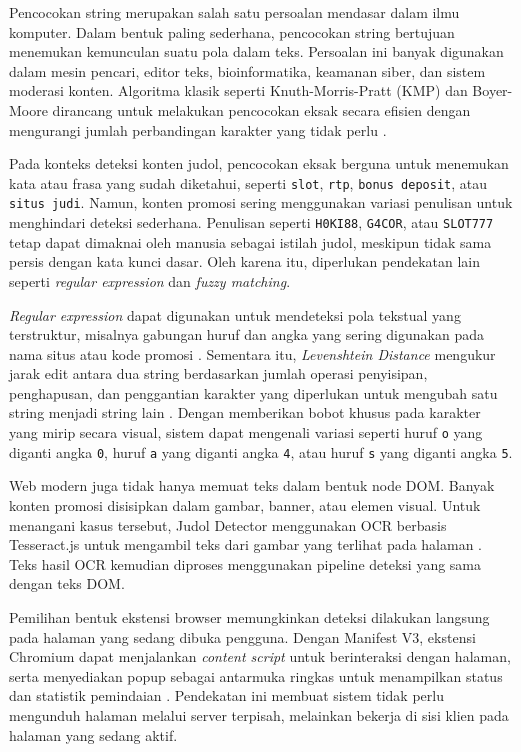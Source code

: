 Pencocokan string merupakan salah satu persoalan mendasar dalam ilmu komputer.
Dalam bentuk paling sederhana, pencocokan string bertujuan menemukan kemunculan
suatu pola dalam teks. Persoalan ini banyak digunakan dalam mesin pencari,
editor teks, bioinformatika, keamanan siber, dan sistem moderasi konten.
Algoritma klasik seperti Knuth-Morris-Pratt (KMP) dan Boyer-Moore dirancang
untuk melakukan pencocokan eksak secara efisien dengan mengurangi jumlah
perbandingan karakter yang tidak perlu \cite{cormen2009introduction}.

Pada konteks deteksi konten judol, pencocokan eksak berguna untuk menemukan
kata atau frasa yang sudah diketahui, seperti \texttt{slot}, \texttt{rtp},
\texttt{bonus deposit}, atau \texttt{situs judi}. Namun, konten promosi sering
menggunakan variasi penulisan untuk menghindari deteksi sederhana. Penulisan
seperti \texttt{H0KI88}, \texttt{G4COR}, atau \texttt{SLOT777} tetap dapat
dimaknai oleh manusia sebagai istilah judol, meskipun tidak sama persis dengan
kata kunci dasar. Oleh karena itu, diperlukan pendekatan lain seperti
\textit{regular expression} dan \textit{fuzzy matching}.

\textit{Regular expression} dapat digunakan untuk mendeteksi pola tekstual
yang terstruktur, misalnya gabungan huruf dan angka yang sering digunakan pada
nama situs atau kode promosi \cite{friedl2006regex}. Sementara itu,
\textit{Levenshtein Distance} mengukur jarak edit antara dua string berdasarkan
jumlah operasi penyisipan, penghapusan, dan penggantian karakter yang
diperlukan untuk mengubah satu string menjadi string lain \cite{levenshtein1966}.
Dengan memberikan bobot khusus pada karakter yang mirip secara visual, sistem
dapat mengenali variasi seperti huruf \texttt{o} yang diganti angka
\texttt{0}, huruf \texttt{a} yang diganti angka \texttt{4}, atau huruf
\texttt{s} yang diganti angka \texttt{5}.

Web modern juga tidak hanya memuat teks dalam bentuk node DOM. Banyak konten
promosi disisipkan dalam gambar, banner, atau elemen visual. Untuk menangani
kasus tersebut, Judol Detector menggunakan OCR berbasis Tesseract.js untuk
mengambil teks dari gambar yang terlihat pada halaman \cite{tesseractjs}.
Teks hasil OCR kemudian diproses menggunakan pipeline deteksi yang sama dengan
teks DOM.

Pemilihan bentuk ekstensi browser memungkinkan deteksi dilakukan langsung pada
halaman yang sedang dibuka pengguna. Dengan Manifest V3, ekstensi Chromium
dapat menjalankan \textit{content script} untuk berinteraksi dengan halaman,
serta menyediakan popup sebagai antarmuka ringkas untuk menampilkan status dan
statistik pemindaian \cite{chrome_extensions}. Pendekatan ini membuat sistem
tidak perlu mengunduh halaman melalui server terpisah, melainkan bekerja di
sisi klien pada halaman yang sedang aktif.

